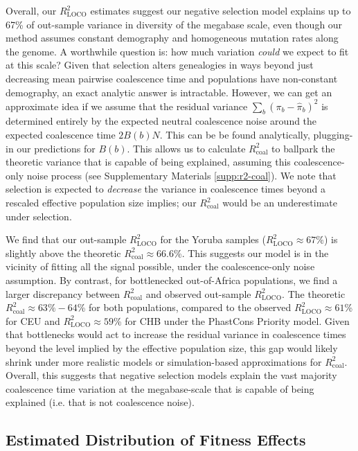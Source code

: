 \documentclass[11pt]{article}
\begin{document}
Overall, our $R_\text{LOCO}^2$ estimates suggest our negative selection model
explains up to 67\% of out-sample variance in diversity of the megabase scale,
even though our method assumes constant demography and homogeneous mutation
rates along the genome. A worthwhile question is: how much variation
\emph{could} we expect to fit at this scale? Given that selection alters
genealogies in ways beyond just decreasing mean pairwise coalescence time and
populations have non-constant demography, an exact analytic answer is
intractable. However, we can get an approximate idea if we assume that the
residual variance $\sum_b (\pi_b - \widehat{\pi}_b)^2$ is determined entirely
by the expected neutral coalescence noise around the expected coalescence time
$2B(b)N$. This can be be found analytically, plugging-in our predictions for
$B(b)$. This allows us to calculate $R_\text{coal}^2$ to ballpark the theoretic
variance that is capable of being explained, assuming this coalescence-only
noise process (see Supplementary Materials \ref{supp:r2-coal}). We note that
selection is expected to \emph{decrease} the variance in coalescence times
beyond a rescaled effective population size implies; our $R_\text{coal}^2$
would be an underestimate under selection.

We find that our out-sample $R_\text{LOCO}^2$ for the Yoruba samples
($R_\text{LOCO}^2 \approx 67$\%) is slightly above the theoretic
$R_\text{coal}^2 \approx 66.6$\%. This suggests our model is in the vicinity of
fitting all the signal possible, under the coalescence-only noise assumption.
By contrast, for bottlenecked out-of-Africa populations, we find a larger
discrepancy between $R_\text{coal}^2$ and observed out-sample
$R_\text{LOCO}^2$. The theoretic $R_\text{coal}^2 \approx 63\%-64$\% for both
populations, compared to the observed $R_\text{LOCO}^2 \approx 61$\% for CEU
and $R_\text{LOCO}^2 \approx 59$\% for CHB under the PhastCons Priority model.
Given that bottlenecks would act to increase the residual variance in
coalescence times beyond the level implied by the effective population size,
this gap would likely shrink under more realistic models or simulation-based
approximations for $R_\text{coal}^2$. Overall, this suggests that negative
selection models explain the vast majority coalescence time variation at the
megabase-scale that is capable of being explained (i.e. that is not coalescence
noise).

\subsection*{Estimated Distribution of Fitness Effects}
\end{document}
